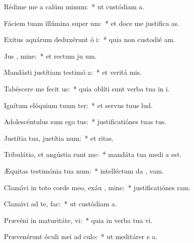 \item Rédime me a calúm minum:~* ut custódiam  a.
\item Fáciem tuam illúmina super  um:~* et doce me justifica as.
\item Exitus aquárum deduxérunt ó i:~* quia non custodié  am.
\item Jus , mine:~* et rectum ju um.
\item Mandásti justítiam testimó a:~* et veritá  mis.
\item Tabéscere me fecit  us:~* quia oblíti sunt verba tua in i.
\item Ignítum elóquium tuum ter:~* et servus tuus  lud.
\item Adolescéntulus sum ego  tus:~* justificatiónes tuas   tus.
\item Justítia tua, justítia  num:~* et   ritas.
\item Tribulátio, et angústia runt me:~* mandáta tua medi a est.
\item Æquitas testimónia tua  num:~* intelléctum da ,  vam.
\item Clamávi in toto corde meo, exáu , mine:~* justificatiónes  ram.
\item Clamávi ad te,   fac:~* ut custódiam  a.
\item Prævéni in maturitáte,  vi:~* quia in verba tua vi.
\item Prævenérunt óculi mei ad  culo:~* ut meditárer e a.
